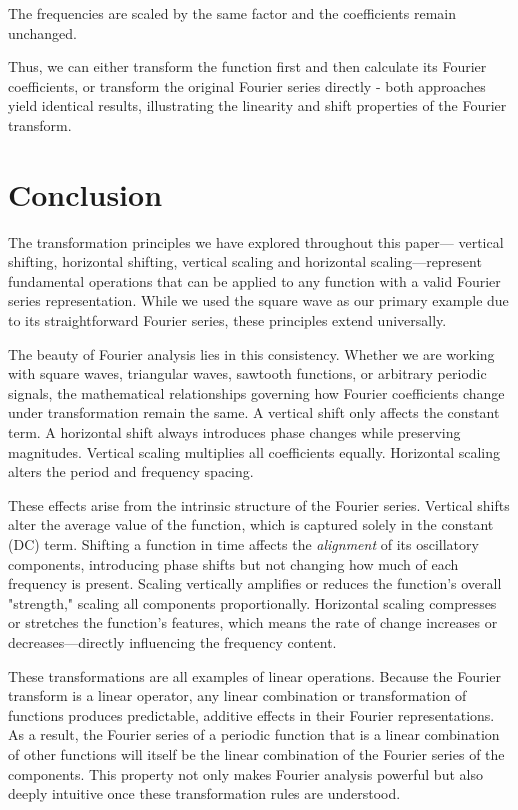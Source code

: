 \documentclass{article}
\begin{document}
The frequencies are scaled by the same factor and the coefficients remain unchanged. 
\vspace{0.2in}

Thus, we can either transform the function first and then calculate its Fourier coefficients, or transform the original Fourier series directly - both approaches yield identical results, illustrating the linearity and shift properties of the Fourier transform.

\section{Conclusion}

The transformation principles we have explored throughout this paper— vertical shifting, horizontal shifting,  vertical scaling and horizontal scaling—represent fundamental operations that can be applied to any function with a valid Fourier series representation. While we used the square wave as our primary example due to its straightforward Fourier series, these principles extend universally.
\vspace{0.2in}

The beauty of Fourier analysis lies in this consistency. Whether we are working with square waves, triangular waves, sawtooth functions, or arbitrary periodic signals, the mathematical relationships governing how Fourier coefficients change under transformation remain the same. A vertical shift only affects the constant term. A horizontal shift always introduces phase changes while preserving magnitudes.  Vertical scaling multiplies all coefficients equally. Horizontal scaling alters the period and frequency spacing. 
\vspace{0.2in}

These effects arise from the intrinsic structure of the Fourier series. Vertical shifts alter the average value of the function, which is captured solely in the constant (DC) term. Shifting a function in time affects the \textit{alignment} of its oscillatory components, introducing phase shifts but not changing how much of each frequency is present. Scaling vertically amplifies or reduces the function’s overall "strength," scaling all components proportionally. Horizontal scaling compresses or stretches the function’s features, which means the rate of change increases or decreases—directly influencing the frequency content. 
\vspace{0.2in}

These transformations are all examples of linear operations. Because the Fourier transform is a linear operator, any linear combination or transformation of functions produces predictable, additive effects in their Fourier representations. As a result, the Fourier series of a periodic function that is a linear combination of other functions will itself be the linear combination of the Fourier series of the components. This property not only makes Fourier analysis powerful but also deeply intuitive once these transformation rules are understood.
\\
\end{document}
